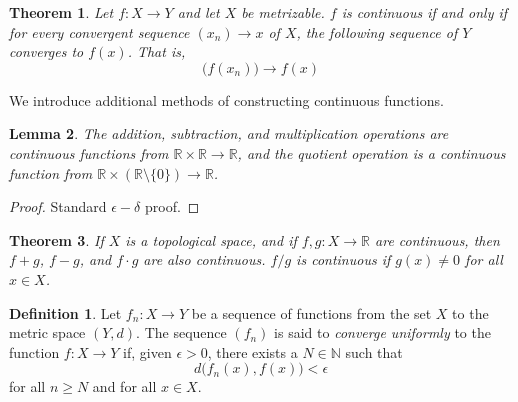 \documentclass{article}
\newtheorem{theorem}{Theorem}[section]
\newtheorem{lemma}[theorem]{Lemma}
\theoremstyle{remark}
\theoremstyle{definition}
\newtheorem{definition}{Definition}[section]
\begin{document}
\begin{theorem}
Let $f: X \longrightarrow Y$ and let $X$ be metrizable. $f$ is continuous if and only if for every convergent sequence $(x_n) \rightarrow x$ of $X$, the following sequence of $Y$ converges to $f(x)$. That is, 
\[\big( f(x_n) \big) \longrightarrow f(x)\]
\end{theorem}

We introduce additional methods of constructing continuous functions. 

\begin{lemma}
The addition, subtraction, and multiplication operations are continuous functions from $\mathbb{R} \times \mathbb{R} \longrightarrow \mathbb{R}$, and the quotient operation is a continuous function from $\mathbb{R} \times (\mathbb{R} \setminus \{0\}) \longrightarrow \mathbb{R}$. 
\end{lemma}
\begin{proof}
Standard $\epsilon-\delta$ proof. 
\end{proof}

\begin{theorem}
If $X$ is a topological space, and if $f, g: X \longrightarrow \mathbb{R}$ are continuous, then $f + g$, $f-g$, and $f \cdot g$ are also continuous. $f / g$ is continuous if $g(x) \neq 0$ for all $x \in X$. 
\end{theorem}

\begin{definition}
Let $f_n: X \longrightarrow Y$ be a sequence of functions from the set $X$ to the metric space $(Y, d)$. The sequence $(f_n)$ is said to \textit{converge uniformly} to the function $f: X \longrightarrow Y$ if, given $\epsilon > 0$, there exists a $N \in \mathbb{N}$ such that
\[d\big( f_n(x), f(x)\big) < \epsilon\]
for all $n \geq N$ and for all $x \in X$. 
\end{definition}
\end{document}
